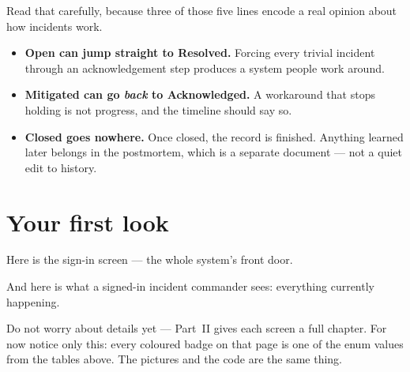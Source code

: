 Read that carefully, because three of those five lines encode a real opinion
about how incidents work.

\begin{itemize}[leftmargin=1.4cm]
\item \textbf{Open can jump straight to Resolved.} Forcing every trivial
  incident through an acknowledgement step produces a system people work around.
\item \textbf{Mitigated can go \emph{back} to Acknowledged.} A workaround that
  stops holding is not progress, and the timeline should say so.
\item \textbf{Closed goes nowhere.} Once closed, the record is finished.
  Anything learned later belongs in the postmortem, which is a separate
  document --- not a quiet edit to history.
\end{itemize}


\section{Your first look}

Here is the sign-in screen --- the whole system's front door.


And here is what a signed-in incident commander sees: everything currently
happening.


Do not worry about details yet --- Part~II gives each screen a full chapter. For
now notice only this: every coloured badge on that page is one of the enum
values from the tables above. The pictures and the code are the same thing.
